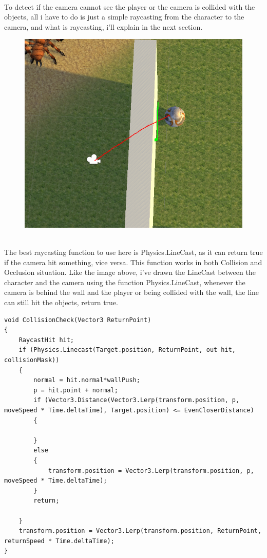 \documentclass[a4paper, 13pt]{extarticle}
\begin{document}
\\[0.05cm] To detect if the camera cannot see the player or the camera is collided with the objects, all i have to do is just a simple raycasting from the character to the camera, and what is raycasting, i'll explain in the next section. 
\begin{figure}[h]
	\centering
	\begin{minipage}{.4\textwidth}
		\centering
		\includegraphics[width=1.3\linewidth]{intructions/raycasting.png}
		\centering
		\label{fig:test13}
	\end{minipage}
\end{figure} 
\\[0.05cm]
The best raycasting function to use here is Physics.LineCast, as it can return true if the camera hit something, vice versa. This function works in both Collision and Occlusion situation. Like the image above, i've drawn the LineCast between the character and the camera using the function Physics.LineCast, whenever the camera is behind the wall and the player or being collided with the wall, the line can still hit the objects, return true. 
\begin{lstlisting}
void CollisionCheck(Vector3 ReturnPoint)
{
	RaycastHit hit;
	if (Physics.Linecast(Target.position, ReturnPoint, out hit, collisionMask))
	{
		normal = hit.normal*wallPush;
		p = hit.point + normal;
		if (Vector3.Distance(Vector3.Lerp(transform.position, p, moveSpeed * Time.deltaTime), Target.position) <= EvenCloserDistance)
		{

		}
		else
		{
			transform.position = Vector3.Lerp(transform.position, p, moveSpeed * Time.deltaTime);
		}
		return;

	}
	transform.position = Vector3.Lerp(transform.position, ReturnPoint, returnSpeed * Time.deltaTime);
}
\end{lstlisting}
\end{document}

